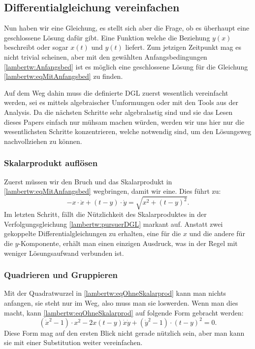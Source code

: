 \subsection{Differentialgleichung vereinfachen
	\label{lambertw:subsection:DGLvereinfach}}
Nun haben wir eine Gleichung, es stellt sich aber die Frage, ob es überhaupt eine geschlossene Lösung dafür gibt. Eine Funktion welche die Beziehung \(y(x)\) beschreibt oder sogar \(x(t)\) und \(y(t)\) liefert. Zum jetzigen Zeitpunkt mag es nicht trivial scheinen, aber mit den gewählten Anfangsbedingungen \eqref{lambertw:Anfangsbed} ist es möglich eine geschlossene Lösung für die Gleichung \eqref{lambertw:eqMitAnfangsbed} zu finden.

Auf dem Weg dahin muss die definierte DGL zuerst wesentlich vereinfacht werden, sei es mittels algebraischer Umformungen oder mit den Tools aus der Analysis. Da die nächsten Schritte sehr algebralastig sind und sie das Lesen dieses Papers einfach nur mühsam machen würden, werden wir uns hier nur die wesentlichsten Schritte konzentrieren, welche notwendig sind, um den Lösungsweg nachvollziehen zu können.

\subsubsection{Skalarprodukt auflösen
	\label{lambertw:subsubsection:SkalProdAufl}}
Zuerst müssen wir den Bruch und das Skalarprodukt in \eqref{lambertw:eqMitAnfangsbed} wegbringen, damit wir eine. Dies führt zu:
\begin{equation}
		-x \cdot \dot{x} + (t-y) \cdot \dot{y}
		= \sqrt{x^2 + (t-y)^2}.
		\label{lambertw:eqOhneSkalarprod}
\end{equation}
Im letzten Schritt, fällt die Nützlichkeit des Skalarproduktes in der Verfolgungsgleichung \eqref{lambertw:pursuerDGL} markant auf. Anstatt zwei gekoppelte Differentialgleichungen zu erhalten, eine für die \(x\) und die andere für die \(y\)-Komponente, erhält man einen einzigen Ausdruck, was in der Regel mit weniger Lösungsaufwand verbunden ist.

\subsubsection{Quadrieren und Gruppieren
	\label{lambertw:subsubsection:QuadUndGrup}}
Mit der Quadratwurzel in \ref{lambertw:eqOhneSkalarprod} kann man nichts anfangen, sie steht nur im Weg, also muss man sie loswerden. Wenn man dies macht, kann \eqref{lambertw:eqOhneSkalarprod} auf folgende Form gebracht werden: 
\begin{equation}
	\left(\dot{x}^2-1\right) \cdot x^2 -2x \left(t-y\right) \dot{x}\dot{y} + \left(\dot{y}^2-1\right) \cdot \left(t-y\right)^2
	=0.
	\label{lambertw:eqOhneWurzel}
\end{equation}
Diese Form mag auf den ersten Blick nicht gerade nützlich sein, aber man kann sie mit einer Substitution weiter vereinfachen.

